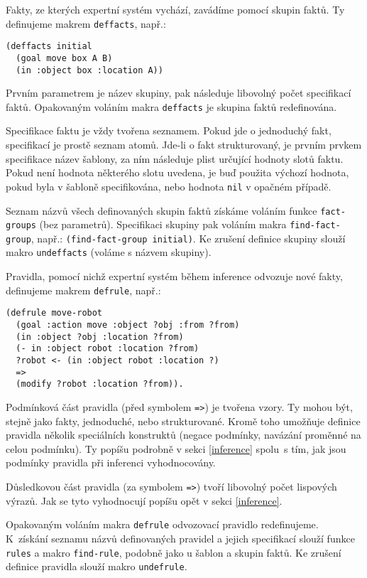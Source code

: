 Fakty, ze kterých expertní systém vychází, zavádíme pomocí skupin faktů. Ty
definujeme makrem \verb|deffacts|, např.:
\begin{verbatim}
(deffacts initial
  (goal move box A B)
  (in :object box :location A))
\end{verbatim}
Prvním parametrem je název skupiny, pak následuje libovolný počet specifikací
faktů. Opakovaným voláním makra \verb|deffacts| je skupina faktů
redefinována.

Specifikace faktu je vždy tvořena seznamem. Pokud jde o jednoduchý fakt,
specifikací je prostě seznam atomů. Jde-li o fakt strukturovaný, je prvním
prvkem specifikace název šablony, za ním následuje plist určující hodnoty slotů
faktu. Pokud není hodnota některého slotu uvedena, je buď použita
výchozí hodnota, pokud byla v šabloně specifikována, nebo hodnota \verb|nil| v
opačném případě.

Seznam názvů všech definovaných skupin faktů získáme voláním funkce
\verb|fact-groups| (bez parametrů). Specifikaci skupiny pak voláním makra
\verb|find-fact-group|, např.: \verb|(find-fact-group initial)|. Ke zrušení
definice skupiny slouží makro \verb|undeffacts| (voláme s názvem skupiny).

Pravidla, pomocí nichž expertní systém během inference odvozuje nové fakty,
definujeme makrem
\verb|defrule|, např.:
\begin{verbatim}
(defrule move-robot
  (goal :action move :object ?obj :from ?from)
  (in :object ?obj :location ?from)
  (- in :object robot :location ?from)
  ?robot <- (in :object robot :location ?)
  =>
  (modify ?robot :location ?from)).
\end{verbatim}
Podmínková část pravidla (před symbolem \verb|=>|) je tvořena vzory. Ty mohou
být, stejně jako fakty, jednoduché, nebo strukturované. Kromě toho umožňuje
definice pravidla několik speciálních konstruktů (negace podmínky, navázání
proměnné na celou podmínku). Ty popíšu podrobně v sekci \ref{inference} spolu~s
tím, jak jsou podmínky pravidla při inferenci vyhodnocovány.

Důsledkovou část pravidla (za symbolem \verb|=>|) tvoří libovolný počet
lispových výrazů. Jak se tyto vyhodnocují popíšu opět v sekci \ref{inference}.

Opakovaným voláním makra \verb|defrule| odvozovací pravidlo redefinujeme.
K~získání seznamu názvů definovaných pravidel a jejich specifikací slouží funkce
\verb|rules| a makro \verb|find-rule|, podobně jako u šablon a skupin faktů.
Ke zrušení definice pravidla slouží makro \verb|undefrule|.
